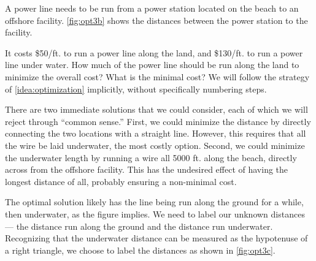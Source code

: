 \begin{example}\label{ex_opt3}
A power line needs to be run from a power station located on the beach to an offshore facility. \autoref{fig:opt3b} shows the distances between the power station to the facility.

It costs \$50/ft. to run a power line along the land, and \$130/ft. to run a power line under water. How much of the power line should be run along the land to minimize the overall cost? What is the minimal cost?
\solution
We will follow the strategy of \autoref{idea:optimization} implicitly, without specifically numbering steps.

There are two immediate solutions that we could consider, each of which we will reject through ``common sense.'' First, we could minimize the distance by directly connecting the two locations with a straight line. However, this requires that all the wire be laid underwater, the most costly option. Second, we could minimize the underwater length by running a wire all 5000 ft. along the beach, directly across from the offshore facility. This has the undesired effect of having the longest distance of all, probably ensuring a non-minimal cost.

The optimal solution likely has the line being run along the ground for a while, then underwater, as the figure implies. We need to label our unknown distances --- the distance run along the ground and the distance run underwater. Recognizing that the underwater distance can be measured as the hypotenuse of a right triangle, we choose to label the distances as shown in \autoref{fig:opt3c}.



\end{example}
